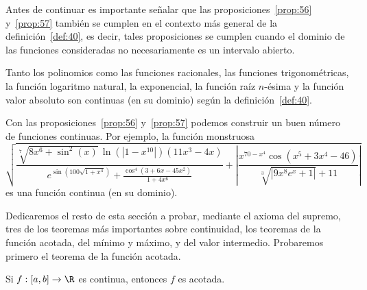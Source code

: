 \documentclass[12pt,a4paper]{book}
\begin{document}
    Antes de continuar es importante señalar que las proposiciones~\ref{prop:56} y~\ref{prop:57}
    también se cumplen en el contexto más general de la definición~\ref{def:40}, es decir,
    tales proposiciones se cumplen cuando el dominio de las funciones consideradas
    no necesariamente es un intervalo abierto.

    Tanto los polinomios como las funciones racionales, las funciones trigonométricas,
    la función logaritmo natural, la exponencial, la función raíz $n$-ésima
    y la función valor absoluto son continuas (en su dominio) según la definición~\ref{def:40}.

    Con las proposiciones~\ref{prop:56} y~\ref{prop:57} podemos construir un buen número de
    funciones continuas. Por ejemplo, la función monstruosa
    \begin{equation*}
        \sqrt{\frac{\sqrt[7]{8x^{6}+\sin^{2}(x)}\,\ln\left(\left|1-x^{10}\right|\right)\left(11x^{3}-4x\right)}{e^{\sin\left(100\sqrt{1+x^{4}}\right)}+\frac{\cos^{4}\left(3+6x-45x^{2}\right)}{1+4x^{6}}}+\left|\frac{x^{70-x^{4}}\cos\left(x^{5}+3x^{4}-46\right)}{\sqrt[3]{\left|9x^{8}e^{x}+1\right|}+11}\right|}
    \end{equation*}
    es una función continua (en su dominio).

    Dedicaremos el resto de esta sección a probar, mediante el axioma del
    supremo, tres de los teoremas más importantes sobre continuidad, los teoremas
    de la función acotada, del mínimo y máximo, y del valor intermedio.
    Probaremos primero el teorema de la función acotada.

    \begin{teorema}\label{teo:1}
        Si $f:[a,b]\to\R$ es continua,
        entonces $f$ es acotada.
    \end{teorema}
\end{document}
